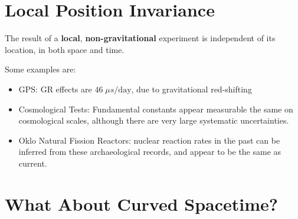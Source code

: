 \section{Local Position Invariance}
The result of a \textbf{local}, \textbf{non-gravitational} experiment is independent of its location, in both space and time.
\par Some examples are:
\begin{itemize}
    \item GPS: GR effects are $46 \; \mu s/\text{day}$, due to gravitational red-shifting
    \item Cosmological Tests: Fundamental constants appear measurable the same on cosmological scales, although there are very large systematic uncertainties.
    \item Oklo Natural Fission Reactors: nuclear reaction rates in the past can be inferred from these archaeological records, and appear to be the same as current.
\end{itemize}

\section{What About Curved Spacetime?}

